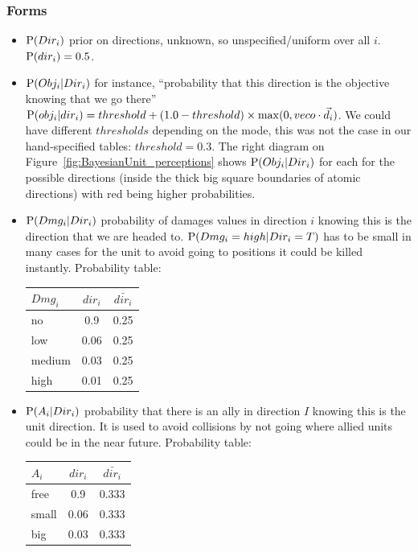 \subsubsection{Forms}

\begin{itemize}
\item $\mathrm{P}(Dir_i)$ prior on directions, unknown, so unspecified/uniform over all $i$. $\mathrm{P}(dir_i) = 0.5$.

\item $\mathrm{P}(Obj_i | Dir_i)$ for instance, ``probability that this direction is the objective knowing that we go there'' $\mathrm{P}(obj_i | dir_i) = threshold + (1.0-threshold)\times \mathrm{max}(0, vec{o} \cdot \vec{d_i})$. %
We could have different $thresholds$ depending on the mode, this was not the case in our hand-specified tables: $threshold = 0.3$. The right diagram on Figure~\ref{fig:BayesianUnit_perceptions} shows $\mathrm{P}(Obj_i|Dir_i)$ for each for the possible directions (inside the thick big square boundaries of atomic directions) with red being higher probabilities.

\item $\mathrm{P}(Dmg_i | Dir_i)$ probability of damages values in direction $i$ knowing this is the direction that we are headed to. $\mathrm{P}(Dmg_i = high | Dir_i = T)$ has to be small in many cases for the unit to avoid going to positions it could be killed instantly. Probability table:\\
\begin{center}
\begin{tabular}{|l|c|c|}
\hline
$Dmg_i$ & $dir_i$ & $\bar{dir_i}$ \\
\hline
no & 0.9 & 0.25 \\
low & 0.06 & 0.25 \\
medium & 0.03 & 0.25 \\
high & 0.01 & 0.25 \\
\hline
\end{tabular}
\end{center}

\item $\mathrm{P}(A_i | Dir_i)$ probability that there is an ally in direction $I$ knowing this is the unit direction. It is used to avoid collisions by not going where allied units could be in the near future. Probability table:\\
\begin{center}
\begin{tabular}{|l|c|c|}
\hline
$A_i$ & $dir_i$ & $\bar{dir_i}$ \\
\hline
free & 0.9 & 0.333 \\
small & 0.06 & 0.333 \\
big & 0.03 & 0.333 \\
\hline
\end{tabular}
\end{center}
 


\end{itemize}
